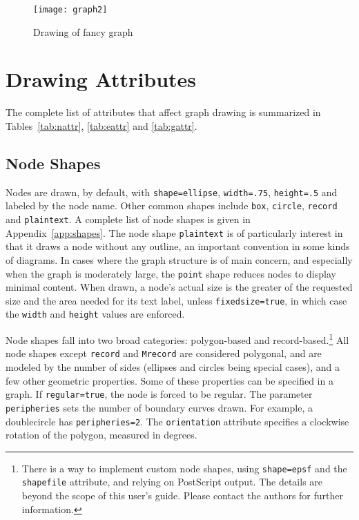 \documentclass[11pt]{article}
\begin{document}
\begin{figure}[p]
	\centerline {
		\texttt{[image: graph2]}
	}
    \caption{Drawing of fancy graph}
    \label{fig:drawing2}
\end{figure}

\section{Drawing Attributes}

The complete list of attributes that affect graph drawing
is summarized in Tables~\ref{tab:nattr}, \ref{tab:eattr} and \ref{tab:gattr}.

\subsection{Node Shapes}
\label{sect:shape}

Nodes are drawn, by default, with {\tt shape=ellipse}, {\tt width=.75},
{\tt height=.5} and labeled by the node name.
Other common shapes include {\tt box}, {\tt circle}, {\tt record} 
and {\tt plaintext}.
A complete list of node shapes is given in Appendix~\ref{app:shapes}.
The node shape {\tt plaintext} is of particularly interest in
that it draws a node without any outline, an important convention
in some kinds of diagrams. In cases where the graph structure is of
main concern, and especially when the graph is moderately large, the
{\tt point} shape reduces nodes to display minimal content.
When drawn, a node's actual size is the greater of the requested
size and the area needed for its text label, unless {\tt fixedsize=true},
in which case the {\tt width} and {\tt height} values are enforced.

Node shapes fall into two broad categories: polygon-based and
record-based.\footnote{There is a way to implement custom node shapes,
using {\tt shape=epsf} and the {\tt shapefile} attribute, and
relying on PostScript output.
The details are beyond the scope of this user's guide.
Please contact the authors for further information.} All node
shapes except {\tt record} and {\tt Mrecord} are considered polygonal,
and are modeled by the number of sides (ellipses and circles being
special cases), and a few other geometric properties. Some of these
properties can be specified in a graph. If {\tt regular=true}, the
node is forced to be regular. The parameter {\tt peripheries} sets
the number of boundary curves drawn. For example, a doublecircle 
has {\tt peripheries=2}.
The {\tt orientation} attribute specifies a clockwise rotation of the 
polygon, measured in degrees.
\end{document}
